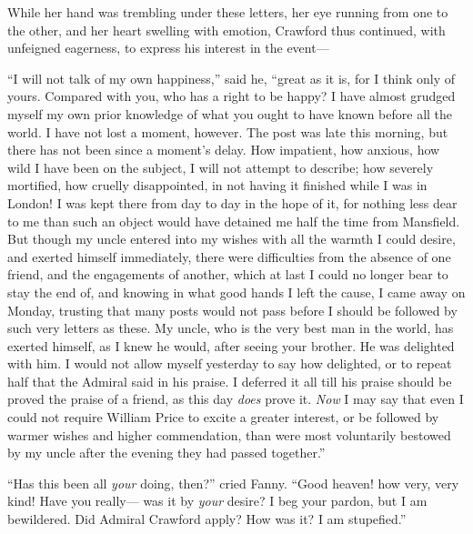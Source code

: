 While her hand was trembling under these letters,
her eye running from one to the other, and her heart
swelling with emotion, Crawford thus continued,
with unfeigned eagerness, to express his interest in the event---%

``I will not talk of my own happiness,'' said he, ``great as
it is, for I think only of yours.  Compared with you,
who has a right to be happy?  I have almost grudged myself
my own prior knowledge of what you ought to have known
before all the world.  I have not lost a moment, however.
The post was late this morning, but there has not been
since a moment's delay.  How impatient, how anxious,
how wild I have been on the subject, I will not attempt
to describe; how severely mortified, how cruelly disappointed,
in not having it finished while I was in London!
I was kept there from day to day in the hope of it,
for nothing less dear to me than such an object would
have detained me half the time from Mansfield.
But though my uncle entered into my wishes with all the
warmth I could desire, and exerted himself immediately,
there were difficulties from the absence of one friend,
and the engagements of another, which at last I could no longer
bear to stay the end of, and knowing in what good hands I
left the cause, I came away on Monday, trusting that many
posts would not pass before I should be followed by such
very letters as these.  My uncle, who is the very best man
in the world, has exerted himself, as I knew he would,
after seeing your brother.  He was delighted with him.
I would not allow myself yesterday to say how delighted,
or to repeat half that the Admiral said in his praise.
I deferred it all till his praise should be proved
the praise of a friend, as this day \emph{does} prove it.
\emph{Now} I may say that even I could not require William
Price to excite a greater interest, or be followed
by warmer wishes and higher commendation, than were most
voluntarily bestowed by my uncle after the evening they had
passed together.''

``Has this been all \emph{your} doing, then?'' cried Fanny.
``Good heaven! how very, very kind!  Have you really---%
was it by \emph{your} desire?  I beg your pardon, but I
am bewildered.  Did Admiral Crawford apply?  How was it?
I am stupefied.''

